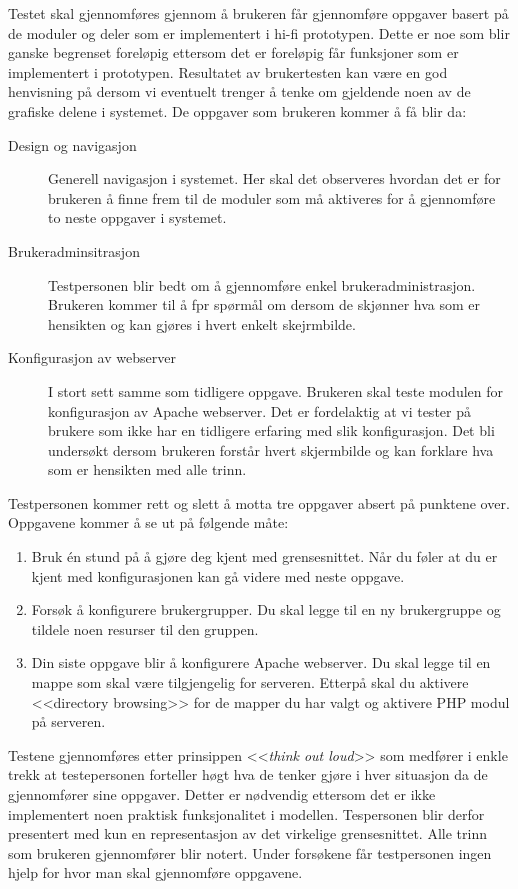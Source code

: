 Testet skal gjennomføres gjennom å brukeren får gjennomføre oppgaver basert på de moduler og deler som er implementert i hi-fi prototypen. Dette er noe som blir ganske begrenset foreløpig ettersom det er foreløpig får funksjoner som er implementert i prototypen. Resultatet av brukertesten kan være en god henvisning på dersom  vi eventuelt trenger å tenke om gjeldende noen av de grafiske delene i systemet. 
De oppgaver som brukeren kommer å få blir da:
\begin{description}
\item[Design og navigasjon]
Generell navigasjon i systemet. Her skal det observeres hvordan det er for brukeren å finne frem til de moduler som må aktiveres for å gjennomføre to neste oppgaver i systemet.
\item[Brukeradminsitrasjon]
Testpersonen blir bedt om å gjennomføre enkel brukeradministrasjon. Brukeren kommer til å fpr spørmål om dersom de skjønner hva som er hensikten og kan gjøres i hvert enkelt skejrmbilde.
\item[Konfigurasjon av webserver]
I stort sett samme som tidligere oppgave. Brukeren skal teste modulen for konfigurasjon av Apache webserver. Det er fordelaktig at vi tester på brukere som ikke har en tidligere erfaring med slik konfigurasjon. Det bli undersøkt dersom brukeren forstår hvert skjermbilde og kan forklare hva som er hensikten med alle trinn.
\end{description}
Testpersonen kommer rett og slett å motta tre oppgaver absert på punktene over. Oppgavene kommer å se ut på følgende måte:
\begin{enumerate}
\setlength{\itemsep}{1pt}
\setlength{\parskip}{0pt}
\setlength{\parsep}{0pt}

\item Bruk én stund på å gjøre deg kjent med grensesnittet. Når du føler at du er kjent med konfigurasjonen kan gå videre med neste oppgave.
\item Forsøk å konfigurere brukergrupper. Du skal legge til en ny brukergruppe og tildele noen resurser til den gruppen.
\item Din siste oppgave blir å konfigurere Apache webserver. Du skal legge til en mappe som skal være tilgjengelig for serveren. Etterpå skal du aktivere <<directory browsing>> for de mapper du har valgt og aktivere PHP modul på serveren.
\end{enumerate}

Testene gjennomføres etter prinsippen <<\textit{think out loud}>> som medfører i enkle trekk at testepersonen forteller høgt hva de tenker gjøre i hver situasjon da de gjennomfører sine oppgaver. Detter er nødvendig ettersom det er ikke implementert noen praktisk funksjonalitet i modellen. Tespersonen blir derfor presentert med kun en representasjon av det virkelige grensesnittet. Alle trinn som brukeren gjennomfører blir notert. Under forsøkene får testpersonen ingen hjelp for hvor man skal gjennomføre oppgavene.

